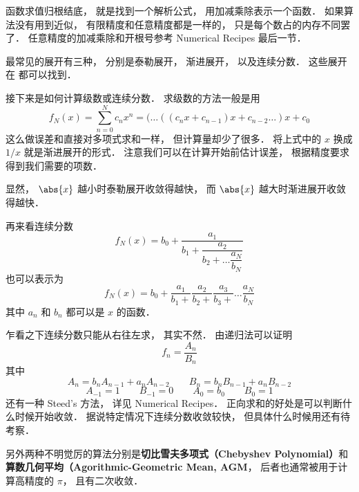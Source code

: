 
函数求值归根结底， 就是找到一个解析公式， 用加减乘除表示一个函数． 如果算法没有用到近似， 有限精度和任意精度都是一样的， 只是每个数占的内存不同罢了． 任意精度的加减乘除和开根号参考 Numerical Recipes 最后一节．

最常见的展开有三种， 分别是泰勒展开， 渐进展开， 以及连续分数． 这些展开在  都可以找到．

接下来是如何计算级数或连续分数． 求级数的方法一般是用
\begin{equation}
f_N(x) = \sum_{n = 0}^N c_n x^n = (\dots ((c_n x + c_{n-1})x + c_{n-2} \dots )x + c_0
\end{equation}
这么做误差和直接对多项式求和一样， 但计算量却少了很多． 将上式中的 $x$ 换成 $1/x$ 就是渐进展开的形式． 注意我们可以在计算开始前估计误差， 根据精度要求得到我们需要的项数．

显然， $\abs{x}$ 越小时泰勒展开收敛得越快， 而 $\abs{x}$ 越大时渐进展开收敛得越快．

再来看连续分数
\begin{equation}
f_N(x) = b_0 + \dfrac{a_1}{b_1 + \dfrac{a_2}{b_2 + \dots \dfrac{a_N}{b_N}}}
\end{equation}
也可以表示为
\begin{equation}
f_N(x) = b_0 + \frac{a_1}{b_1 +} \frac{a_2}{b_2 +} \frac{a_3}{b_3 +} \dots \frac{a_N}{b_N}
\end{equation}
其中 $a_n$ 和 $b_n$ 都可以是 $x$ 的函数．

乍看之下连续分数只能从右往左求， 其实不然． 由递归法可以证明
\begin{equation}
f_n = \frac{A_n}{B_n}
\end{equation}
其中
\begin{equation}
A_n = b_n A_{n-1} + a_n A_{n-2} \qquad
B_n = b_n B_{n-1} + a_n B_{n-2}
\end{equation}
\begin{equation}
A_{-1} = 1 \qquad B_{-1} = 0
\qquad A_0 = b_0 \qquad B_0 = 1
\end{equation}
还有一种 Steed's 方法， 详见 Numerical Recipes． 正向求和的好处是可以判断什么时候开始收敛．
据说特定情况下连续分数收敛较快， 但具体什么时候用还有待考察．

另外两种不明觉厉的算法分别是\textbf{切比雪夫多项式（Chebyshev Polynomial）}和\textbf{算数几何平均（Agorithmic-Geometric Mean, AGM}， 后者也通常被用于计算高精度的 $\pi$， 且有二次收敛．
